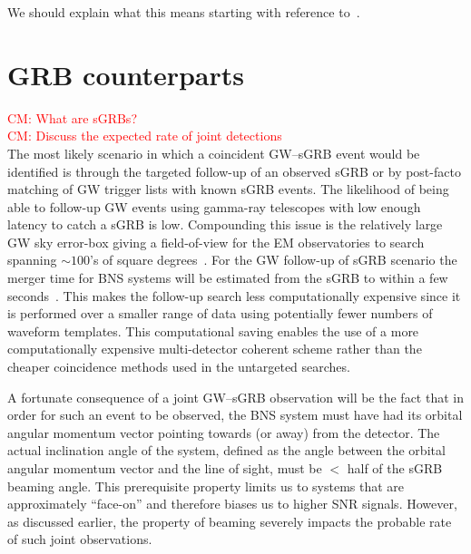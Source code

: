 \documentclass[12pt]{iopart}
\newcommand{\cm}[1]{\textcolor{red}{CM: #1}}
\begin{document}
We should explain what this means starting with reference
to~\cite{1986Natur.323..310S}.

\section{GRB counterparts\label{sec:GRB}}

\cm{What are sGRBs?}\\

\cm{Discuss the expected rate of joint detections}\\

The most likely scenario in which a coincident \ac{GW}--\ac{sGRB} event would
be identified is through the targeted follow-up of an observed \ac{sGRB} or by
post-facto matching of \ac{GW} trigger lists with known \ac{sGRB} events.  The
likelihood of being able to follow-up \ac{GW} events using gamma-ray telescopes
with low enough latency to catch a \ac{sGRB} is low.  Compounding this issue is
the relatively large \ac{GW} sky error-box giving a field-of-view for the
\ac{EM} observatories to search spanning $\sim 100$'s of square
degrees~\cite{grb}.  For the \ac{GW} follow-up of \ac{sGRB} scenario the merger
time for \ac{BNS} systems will be estimated from the \ac{sGRB} to within a few
seconds~\cite{grb}.  This makes the follow-up search less computationally
expensive since it is performed over a smaller range of data using potentially
fewer numbers of waveform templates.  This computational saving enables the use
of a more computationally expensive multi-detector coherent scheme rather than
the cheaper coincidence methods used in the untargeted searches. 

A fortunate consequence of a joint \ac{GW}--\ac{sGRB} observation will be the
fact that in order for such an event to be observed, the \ac{BNS} system must
have had its orbital angular momentum vector pointing towards (or away) from
the detector.  The actual inclination angle of the system, defined as the angle
between the orbital angular momentum vector and the line of sight, must be $<$
half of the \ac{sGRB} beaming angle.  This prerequisite property limits us to
systems that are approximately ``face-on'' and therefore biases us to higher
\ac{SNR} signals.  However, as discussed earlier, the property of beaming
severely impacts the probable rate of such joint observations.   
\end{document}
